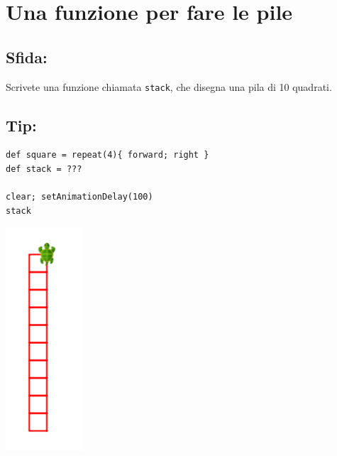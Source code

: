 \chapter{Una funzione per fare le pile}
\begin{multicols}{2}
\section*{\color{BrickRed}Sfida:}
Scrivete una funzione chiamata \lstinline{stack}, che disegna una pila di 10 quadrati.
\section*{\color{OliveGreen}Tip:}

\begin{lstlisting}[numbers=none]
def square = repeat(4){ forward; right }  
def stack = ???

clear; setAnimationDelay(100)
stack
\end{lstlisting}
        

\columnbreak

\begin{center}
\includegraphics{../img/square-column.png}
\end{center}

\end{multicols}

